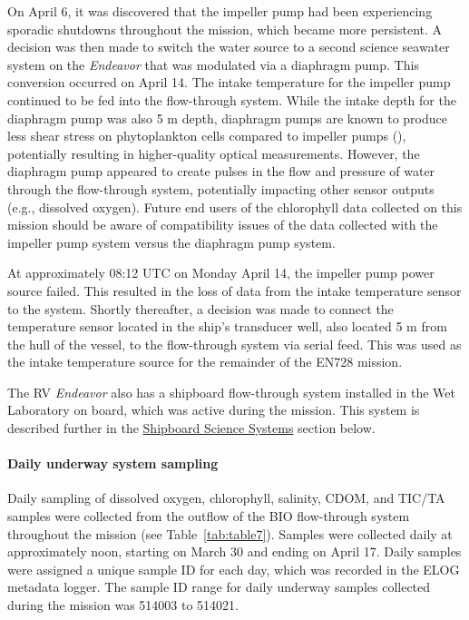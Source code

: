 \documentclass[12pt]{article}\usepackage[]{graphicx}\usepackage[]{color}
\begin{document}
On April 6, it was discovered that the impeller pump had been experiencing sporadic shutdowns throughout the mission, which became more persistent. A decision was then made to switch the water source to a second science seawater system on the \emph{Endeavor} that was modulated via a diaphragm pump. This conversion occurred on April 14. The intake temperature for the impeller pump continued to be fed into the flow-through system. While the intake depth for the diaphragm pump was also 5 m depth, diaphragm pumps are known to produce less shear stress on phytoplankton cells compared to impeller pumps (), potentially resulting in higher-quality optical measurements. However, the diaphragm pump appeared to create pulses in the flow and pressure of water through the flow-through system, potentially impacting other sensor outputs (e.g., dissolved oxygen). Future end users of the chlorophyll data collected on this mission should be aware of compatibility issues of the data collected with the impeller pump system versus the diaphragm pump system.

At approximately 08:12 UTC on Monday April 14, the impeller pump power source failed. This resulted in the loss of data from the intake temperature sensor to the system. Shortly thereafter, a decision was made to connect the temperature sensor located in the ship's transducer well, also located 5 m from the hull of the vessel, to the flow-through system via serial feed. This was used as the intake temperature source for the remainder of the EN728 mission.

The RV \emph{Endeavor} also has a shipboard flow-through system installed in the Wet Laboratory on board, which was active during the mission. This system is described further in the \hyperref[shipboard-systems]{Shipboard Science Systems} section below.

\paragraph{Daily underway system sampling}\label{daily-underway-system-sampling}

Daily sampling of dissolved oxygen, chlorophyll, salinity, CDOM, and TIC/TA samples were collected from the outflow of the BIO flow-through system throughout the mission (see Table~\ref{tab:table7}). Samples were collected daily at approximately noon, starting on March 30 and ending on April 17. Daily samples were assigned a unique sample ID for each day, which was recorded in the ELOG metadata logger. The sample ID range for daily underway samples collected during the mission was 514003 to 514021.
\end{document}

